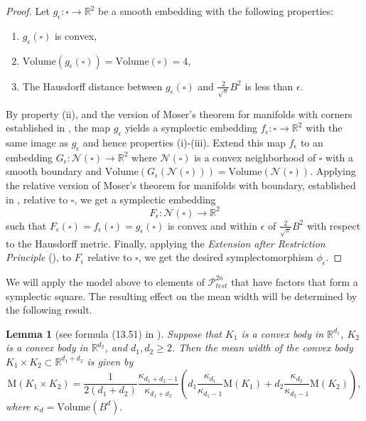 \documentclass[12pt]{amsart}
\newtheorem{lemma}[theorem]{Lemma}
\theoremstyle{definition}
\newtheorem{remark}[theorem]{Remark}
\newcommand{\RR}{{\mathbb R}}
\newcommand{\V}{{\mathrm {Volume}}}
\newcommand{\mw}{{{\mathrm {M}}}}
\begin{document}
\begin{proof}

Let $g_{\epsilon} \colon \square \to \RR^2$ be a smooth embedding with the following properties:
\begin{enumerate}
    \item[(i)] $g_{\epsilon}(\square)$ is convex,
    \item[(ii)] $\V(g_{\epsilon}(\square)) = \V(\square) = 4$,
    \item[(iii)] The Hausdorff distance between $g_{\epsilon}(\square)$ and $\frac{2}{\sqrt{\pi}} B^2$ is less than $\epsilon.$
\end{enumerate}
By property (ii), and the version of Moser's theorem for manifolds with corners established in \cite{bmpr}, the map $g_{\epsilon}$ yields a symplectic embedding $f_{\epsilon} \colon \square \to \RR^2$ with the same image as $g_{\epsilon}$ and hence properties (i)-(iii). Extend this map $f_{\epsilon}$ to an embedding $G_{\epsilon} \colon \mathcal{N}(\square) \to \RR^2$ where $\mathcal{N}(\square)$ is a convex neighborhood of $\square$ with a smooth boundary and $\V(G_{\epsilon} (\mathcal{N}(\square))) = \V(\mathcal{N}(\square))$. Applying the relative version of Moser's theorem for manifolds with boundary, established in \cite{ban}, relative to $\square$, we get a symplectic embedding $$F_{\epsilon} \colon \mathcal{N}(\square) \to \RR^2 $$ such that $F_{\epsilon}(\square) =f_{\epsilon}(\square) = g_{\epsilon}(\square)$ is convex and within $\epsilon$ of  $\frac{2}{\sqrt{\pi}} B^2$ with respect to the Hausdorff metric. Finally, applying the {\em Extension after Restriction Principle} (\cite{schl}),  to $F_{\epsilon}$ relative to $\square$, we get the desired symplectomorphism $\phi_{\epsilon}$.
\end{proof}



We will apply the model above to elements of $\mathcal{P}^{2n}_{test}$ that have factors that form a symplectic square. The resulting effect on the mean width will be determined by the following result.

\begin{lemma}[see formula (13.51) in \cite{sant}]\label{product}
    Suppose that $K_1$ is a convex body in $\RR^{d_1}$,  $K_2$ is a convex body in $\RR^{d_2}$, and $d_1,d_2 \geq 2$. Then the mean width of the convex body $K_1 \times K_2 \subset \RR^{d_1 + d_2}$ is given by 
\begin{equation*}
    \mw(K_1 \times K_2) = \frac{1}{2(d_1+d_2)} \frac{\kappa_{d_1+d_2-1}}{\kappa_{d_1+d_2}} \left( d_1 \frac{\kappa_{d_1}}{\kappa_{d_1-1}}\mw(K_1) + d_2 \frac{\kappa_{d_2}}{\kappa_{d_2-1}} \mw(K_2)  \right),
\end{equation*}
 where $\kappa_d =\V(B^d).$   
\end{lemma}
\end{document}

